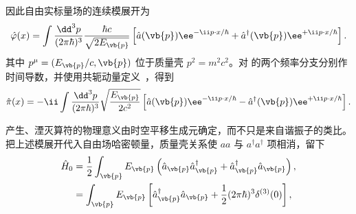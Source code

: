 因此自由实标量场的连续模展开为
\begin{equation}
 {
 \hat\varphi(x)=
 \int\frac{\dd^3 p}{(2\pi\hbar)^3}
 \frac{\hbar c}{\sqrt{2E_{\vb{p}}}}
 \left[
 \hat a(\vb{p})\ee^{-\ii p\cdot x/\hbar}
 +\hat a^\dagger(\vb{p})\ee^{+\ii p\cdot x/\hbar}
 \right].}
 \label{eq:scalar-mode-r2}
\end{equation}
其中 $p^\mu=(E_{\vb{p}}/c,\vb{p})$ 位于质量壳 $p^2=m^2c^2$。对 的两个频率分支分别作时间导数，并使用共轭动量定义~，得到
\begin{equation*}
 \hat\pi(x)=
 -\ii\int\frac{\dd^3 p}{(2\pi\hbar)^3}
 \sqrt{\frac{E_{\vb{p}}}{2c^2}}
 \left[
 \hat a(\vb{p})\ee^{-\ii p\cdot x/\hbar}
 -\hat a^\dagger(\vb{p})\ee^{+\ii p\cdot x/\hbar}
 \right].
\end{equation*}

产生、湮灭算符的物理意义由时空平移生成元确定，而不只是来自谐振子的类比。把上述模展开代入自由场哈密顿量，质量壳关系使 $aa$ 与 $a^\dagger a^\dagger$ 项相消，留下
\begin{align}
 \hat H_0
 &=\frac12\int_{\vb{p}}E_{\vb{p}}
 \left(
 \hat a_{\vb{p}}\hat a_{\vb{p}}^\dagger
 +\hat a_{\vb{p}}^\dagger\hat a_{\vb{p}}
 \right),\\
 &=\int_{\vb{p}}E_{\vb{p}}
 \left[
 \hat a_{\vb{p}}^\dagger\hat a_{\vb{p}}
 +\frac12(2\pi\hbar)^3\delta^{(3)}(0)
 \right],
 \label{eq:scalar-H-vac-r2}
\end{align}

